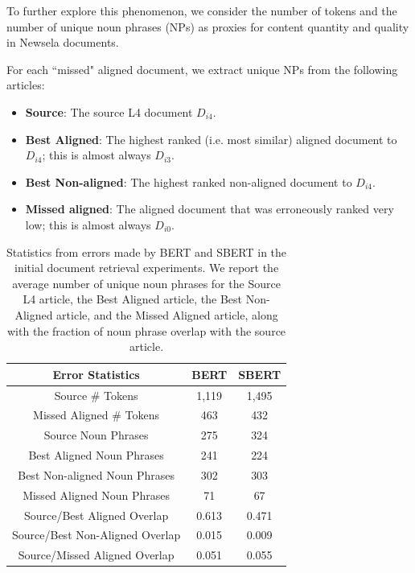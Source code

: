 \documentclass[thesis.tex]{subfiles}
\begin{document}
To further explore this phenomenon, we consider the number of tokens and the number of unique noun phrases (NPs) as proxies for content quantity and quality in Newsela documents.

For each ``missed" aligned document, we extract unique NPs from the following articles:
\begin{itemize} \label{errors}
\item \textbf{Source}: The source L4 document $D_{i4}$.
\item \textbf{Best Aligned}: The highest ranked (i.e. most similar) aligned document to $D_{i4}$; this is almost always $D_{i3}$.
\item \textbf{Best Non-aligned}: The highest ranked non-aligned document to $D_{i4}$.
\item \textbf{Missed aligned}: The aligned document that was erroneously ranked very low; this is almost always $D_{i0}$.
\end{itemize}

\begin{table}
\begin{center}
\begin{tabular}{|c|c c|} \hline
\textbf{Error Statistics} & \textbf{BERT} & \textbf{SBERT} \\ \hline
Source \# Tokens & 1,119 & 1,495 \\
Missed Aligned \# Tokens & 463 & 432 \\ \hline
Source Noun Phrases & 275 & 324 \\
Best Aligned Noun Phrases & 241 & 224 \\
Best Non-aligned Noun Phrases & 302 & 303 \\ 
Missed Aligned Noun Phrases & 71 & 67 \\ \hline
Source/Best Aligned Overlap & 0.613 & 0.471 \\
Source/Best Non-Aligned Overlap & 0.015 & 0.009 \\ 
Source/Missed Aligned Overlap & 0.051 & 0.055 \\ \hline
\end{tabular}
\end{center}
\caption{\label{table:errors} Statistics from errors made by BERT and SBERT in the initial document retrieval experiments. We report the average number of unique noun phrases for the Source L4 article, the Best Aligned article, the Best Non-Aligned article, and the Missed Aligned article, along with the fraction of noun phrase overlap with the source article.}
\end{table}
\end{document}
